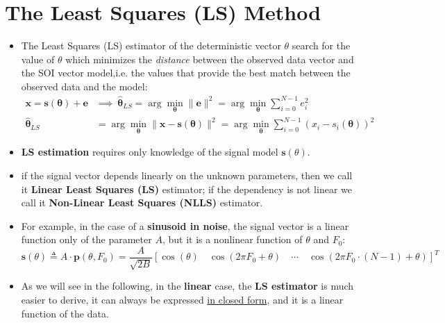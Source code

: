 \section{The Least Squares (LS) Method}
\begin{itemize}
    \item The Least Squares (LS) estimator of the deterministic vector \(\theta\) search for the value of \(\theta\) which minimizes the \textit{distance} between the observed data vector and the SOI vector model,i.e. the values that provide the best match between the observed data and the model:
    \begin{align*}
\mathbf{x} = \mathbf{s}(\boldsymbol{\theta}) + \mathbf{e}
&\implies
\ \hat{\boldsymbol{\theta}}_{LS} = \arg\min_{\boldsymbol{\theta}} \|\mathbf{e}\|^2 = \arg\min_{\boldsymbol{\theta}} \sum_{i=0}^{N-1} e_i^2 \\[2ex]
\hat{\boldsymbol{\theta}}_{LS}
&= \arg\min_{\boldsymbol{\theta}} \| \mathbf{x} - \mathbf{s}(\boldsymbol{\theta}) \|^2 = \arg\min_{\boldsymbol{\theta}} \sum_{i=0}^{N-1} (x_i - s_i(\boldsymbol{\theta}))^2
\end{align*}

    \item \textbf{LS estimation} requires only knowledge of the signal model \(\mathbf{s}(\theta)\).
    \item if the signal vector depends linearly on the unknown parameters, then we call it \textbf{Linear Least Squares (LS)} estimator; if the dependency is not linear we call it \textbf{Non-Linear Least Squares (NLLS)} estimator.
    \item For example, in the case of a \textbf{sinusoid in noise}, the signal vector is a linear function only of the parameter \(A\), but it is a nonlinear function of \(\theta\) and \(F_0\):
\[
\mathbf{s}(\theta) \triangleq A \cdot \mathbf{p}(\theta, F_0)
= \frac{A}{\sqrt{2B}} \left[
\cos(\theta) \quad
\cos(2\pi F_0 + \theta) \quad
\cdots \quad
\cos\left( 2\pi F_0 \cdot (N-1) + \theta \right)
\right]^T
\]
    \item As we will see in the following, in the \textbf{linear} case, the \textbf{LS estimator} is much easier to derive, it can always be expressed \underline{in closed form}, and it is a linear function of the data.

\end{itemize}
